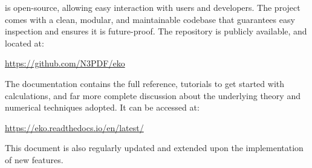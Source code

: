 \eko is open-source, allowing easy interaction with users and developers.
The project comes with a clean, modular, and maintainable codebase that
guarantees easy inspection and ensures it is future-proof.
The repository is publicly available, and located at:
\begin{center}
\url{https://github.com/N3PDF/eko}
\end{center}
The \eko documentation contains the full \api reference, tutorials to get
started with \eko calculations, and far more complete discussion about the
underlying theory and numerical techniques adopted.
It can be accessed at:
\begin{center}
\url{https://eko.readthedocs.io/en/latest/}
\end{center}
This document is also regularly updated and extended upon the
implementation of new features.

